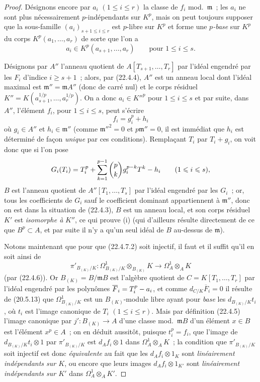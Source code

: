 \begin{proof}
Désignons encore par $a_i$ $(1\leqslant i\leqslant r)$ la classe de $f_i$
mod.~$\mathfrak m$~; les $a_i$ ne sont plus nécessairement $p$-indépendants
sur $K^p$, mais on peut toujours supposer que la sous-famille
$(a_i)_{s+1\leqslant i\leqslant r}$ est $p$-libre sur $K^p$ et forme une
\emph{$p$-base} sur $K^p$ du corps $K^p(a_1,\ldots,a_r)$ de sorte que l'on a
\[
  a_i\in K^p(a_{s+1},\ldots,a_r)\qquad\text{pour }1\leqslant i\leqslant s.
\]

Désignons par $A''$ l'anneau quotient de $A[T_{s+1},\ldots,T_r]$ par l'idéal
engendré par les $F_i$ d'indice $i\geqslant s+1$~; alors, par (22.4.4), $A''$
est un anneau local dont l'idéal maximal est $\mathfrak m''=\mathfrak mA''$
(donc de carré nul) et le corps résiduel
$K''=K(a_{s+1}^{1/p},\ldots,a_r^{1/p})$. On a donc
$a_i\in K''^p$ pour $1\leqslant i\leqslant s$ et par suite, dans $A''$,
l'élément $f_i$, pour $1\leqslant i\leqslant s$, peut s'écrire
\begin{equation}
\label{0.22.4.7.3-fr}
  f_i=g_i^p+h_i
  \tag{22.4.7.3}
\end{equation}
où $g_i\in A''$ et $h_i\in\mathfrak m''$ (comme $\mathfrak m''^2=0$ et
$p\mathfrak m''=0$, il est immédiat que $h_i$ est déterminé de façon
\emph{unique} par ces conditions). Remplaçant $T_i$ par $T_i+g_i$, on voit donc
que si l'on pose
\[
  G_i(T_i)=T_i^p+\sum_{k=1}^{p-1}\binom pk g_i^{p-k}T^k- h_i
  \qquad(1\leqslant i\leqslant s),
\]
$B$ est l'anneau quotient de $A''[T_1,\ldots,T_s]$ par l'idéal engendré par les
$G_i$~; or, tous les coefficients de $G_i$ sauf le coefficient dominant
appartiennent à $\mathfrak m''$, donc on est dans la situation de (22.4.3),
$B$ est un anneau local, et son corps résiduel $K'$ est \emph{isomorphe à}
$K''$, ce qui prouve (i) (qui d'ailleurs résulte directement de ce que
$B^p\subset A$, et par suite il n'y a qu'un seul idéal de $B$ au-dessus de
$\mathfrak m$).

Notons maintenant que pour que (22.4.7.2) soit injectif, il faut et il suffit
qu'il en soit ainsi de
\[
  \pi'_{B_{(K)}/K}:\Omega^1_{B_{(K)}/K}\otimes_{B_{(K)}}K
  \longrightarrow\Omega^1_A\otimes_AK
\]
(par (22.4.6)). Or $B_{(K)}=B/\mathfrak mB$ est l'algèbre quotient de
$C=K[T_1,\ldots,T_r]$ par l'idéal engendré par les polynômes
$\overline F_i=T_i^p- a_i$, et comme $d_{C/K}\overline F_i=0$ il résulte de
(20.5.13) que $\Omega^1_{B_{(K)}/K}$ est un $B_{(K)}$-module libre ayant pour
\emph{base} les $d_{B_{(K)}/K}t_i$, où $t_i$ est l'image canonique de $T_i$
$(1\leqslant i\leqslant r)$. Mais par définition (22.4.5) l'image canonique par
$j':B_{(K)}\longrightarrow A$ d'une classe mod.~$\mathfrak mB$ d'un élément
$x\in B$ est l'élément $x^p\in A$~; on en déduit aussitôt, puisque $t_i^p=f_i$,
que l'image de $d_{B_{(K)}/K}t_i\otimes1$ par $\pi'_{B_{(K)}/K}$ est
$d_Af_i\otimes1$ dans $\Omega^1_A\otimes_AK$~; la condition que
$\pi'_{B_{(K)}/K}$ soit injectif est donc \emph{équivalente} au fait que les
$d_Af_i\otimes1_K$ sont \emph{linéairement indépendants sur $K$}, ou encore
que leurs images $d_Af_i\otimes1_{K'}$ sont \emph{linéairement indépendants
sur $K'$} dans $\Omega^1_A\otimes_AK'$.


\end{proof}
